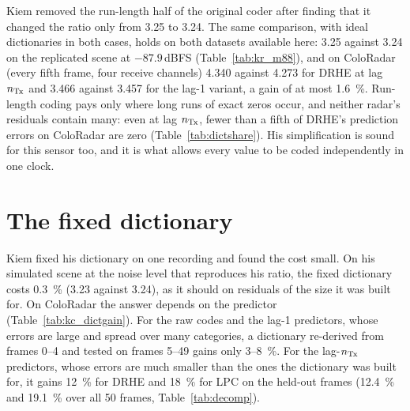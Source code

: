 Kiem removed the run-length half of the original coder after finding that it
changed the ratio only from 3.25 to 3.24. The same comparison, with ideal
dictionaries in both cases, holds on both datasets available here: 3.25 against
3.24 on the replicated scene at $-87.9$\,dBFS (Table~\ref{tab:kr_m88}), and on
ColoRadar (every fifth frame, four receive channels) 4.340 against 4.273 for
DRHE at lag $n_{\mathrm{Tx}}$ and 3.466 against 3.457 for the lag-1 variant, a gain of at
most \SI{1.6}{\percent}. Run-length coding pays only where long runs of exact
zeros occur, and neither radar's residuals contain many: even at lag $n_{\mathrm{Tx}}$,
fewer than a fifth of DRHE's prediction errors on ColoRadar are zero
(Table~\ref{tab:dictshare}). His simplification is sound for this sensor too,
and it is what allows every value to be coded independently in one clock.

\section{The fixed dictionary}
\label{sec:kc_dict}

Kiem fixed his dictionary on one recording and found the cost small. On his
simulated scene at the noise level that reproduces his ratio, the fixed
dictionary costs \SI{0.3}{\percent} (3.23 against 3.24), as it should on
residuals of the size it was built for. On ColoRadar the answer depends on the
predictor (Table~\ref{tab:kc_dictgain}). For the raw codes and the lag-1
predictors, whose errors are large and spread over many categories, a
dictionary re-derived from frames 0--4 and tested on frames 5--49 gains only
3--\SI{8}{\percent}. For the lag-$n_{\mathrm{Tx}}$ predictors, whose errors are much
smaller than the ones the dictionary was built for, it gains
\SI{12}{\percent} for DRHE and \SI{18}{\percent} for LPC on the held-out
frames (\SI{12.4}{\percent} and \SI{19.1}{\percent} over all 50 frames,
Table~\ref{tab:decomp}).

